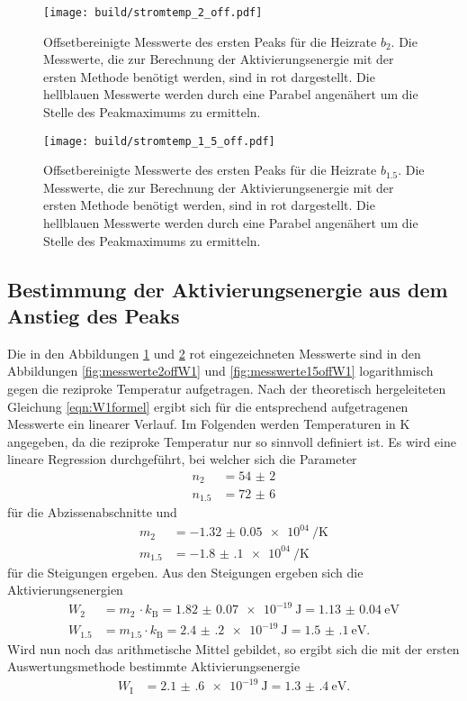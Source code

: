 \begin{figure}
  \centering
  \texttt{[image: build/stromtemp\_2\_off.pdf]}
  \caption{Offsetbereinigte Messwerte des ersten Peaks für die Heizrate $b_{2}$. Die Messwerte, die zur Berechnung der Aktivierungsenergie mit der
  ersten Methode benötigt werden, sind in rot dargestellt. Die hellblauen Messwerte werden durch eine Parabel angenähert um
  die Stelle des Peakmaximums zu ermitteln.}
  \label{fig:messwerte2off}
\end{figure}

\begin{figure}
  \centering
  \texttt{[image: build/stromtemp\_1\_5\_off.pdf]}
  \caption{Offsetbereinigte Messwerte des ersten Peaks für die Heizrate $b_{1.5}$. Die Messwerte, die zur Berechnung der Aktivierungsenergie mit der
  ersten Methode benötigt werden, sind in rot dargestellt. Die hellblauen Messwerte werden durch eine Parabel angenähert um
  die Stelle des Peakmaximums zu ermitteln.}
  \label{fig:messwerte15off}
\end{figure}

\subsection{Bestimmung der Aktivierungsenergie aus dem Anstieg des Peaks}

Die in den Abbildungen \ref{fig:messwerte2off} und \ref{fig:messwerte15off} rot
eingezeichneten Messwerte sind in den Abbildungen \ref{fig:messwerte2offW1} und
\ref{fig:messwerte15offW1} logarithmisch gegen die reziproke Temperatur
aufgetragen. Nach der theoretisch hergeleiteten Gleichung \eqref{eqn:W1formel}
ergibt sich für die entsprechend aufgetragenen Messwerte ein linearer Verlauf.
Im Folgenden werden Temperaturen in $\si{\kelvin}$ angegeben, da die reziproke
Temperatur nur so sinnvoll definiert ist. Es wird eine lineare Regression durchgeführt,
bei welcher sich die Parameter
\begin{align}
  n_{2} &= \num{54(2)} \\
  n_{1.5} &= \num{72(6)}
\end{align}
für die Abzissenabschnitte und
\begin{align}
  m_{2} &= \SI{-1.32(5)e04}{\per\kelvin} \\
  m_{1.5} &= \SI{-1.8(1)e04}{\per\kelvin}
\end{align}
für die Steigungen ergeben. Aus den Steigungen ergeben sich die Aktivierungsenergien
\begin{align}
  W_{2} &= m_{2} \, \cdot k_\text{B} = \SI{1.82(7)e-19}{\joule} = \SI{1.13(4)}{\electronvolt} \\
  W_{1.5} &= m_{1.5} \cdot k_\text{B} = \SI{2.4(2)e-19}{\joule} = \SI{1.5(1)}{\electronvolt}.
\end{align}
Wird nun noch das arithmetische Mittel gebildet, so ergibt sich die mit der ersten
Auswertungsmethode bestimmte Aktivierungsenergie
\begin{align}
  W_{\text{I}} &= \SI{2.1(6)e-19}{\joule} = \SI{1.3(4)}{\electronvolt}.
\end{align}

